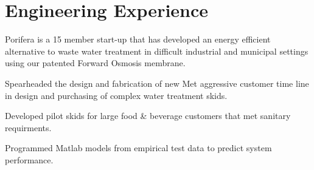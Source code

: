 \documentclass[]{deedy-resume-openfont}
\begin{document}
\lastupdated



\section{Engineering Experience}

Porifera is a 15 member start-up that has developed an energy efficient alternative to waste water treatment in difficult industrial and municipal settings using our patented Forward Osmosis membrane.

\begin{tightemize2}
\item Spearheaded the design and fabrication of new
Met aggressive customer time line in design and purchasing of complex water treatment skids.
\item Developed pilot skids for large food \& beverage customers that met sanitary requirments.
 \item Programmed Matlab models from empirical test data to predict system performance.
\end{tightemize2}
\sectionsep


\end{document}
